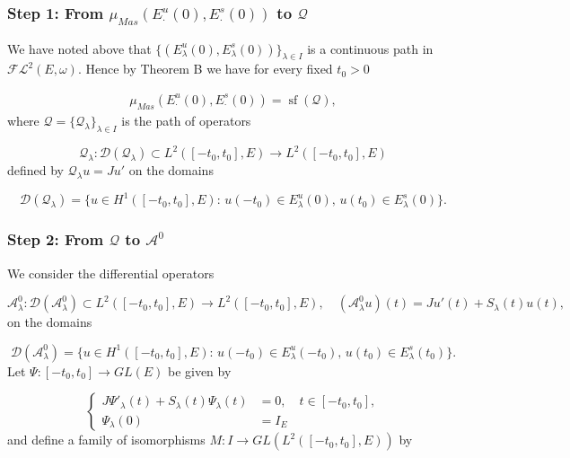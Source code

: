 \documentclass[a4paper,10pt]{article}
\DeclareMathOperator{\sfl}{sf}
\begin{document}
\subsubsection*{Step 1: From $\mu_{Mas}(E^u_\cdot(0),E^s_\cdot(0))$ to $\mathcal{Q}$}
We have noted above that $\{(E^u_\lambda(0),E^s_\lambda(0))\}_{\lambda\in I}$ is a continuous path in $\mathcal{FL}^2(E,\omega)$. Hence by Theorem B we have for every fixed $t_0>0$

\begin{align}\label{mas=sfl}
\mu_{Mas}(E^u_\cdot(0),E^s_\cdot(0))=\sfl(\mathcal{Q}),
\end{align}
where $\mathcal{Q}=\{\mathcal{Q}_\lambda\}_{\lambda\in I}$ is the path of operators 

\[\mathcal{Q}_\lambda:\mathcal{D}(\mathcal{Q}_\lambda)\subset L^2([-t_0,t_0],E)\rightarrow L^2([-t_0,t_0],E)\] defined by $\mathcal{Q}_\lambda u=Ju'$ on the domains

\[\mathcal{D}(\mathcal{Q}_\lambda)=\{u\in H^1([-t_0,t_0],E):\, u(-t_0)\in E^u_\lambda(0),\, u(t_0)\in E^s_\lambda(0)\}.\]







\subsubsection*{Step 2: From $\mathcal{Q}$ to $\mathcal{A}^0$}
We consider the differential operators

\[\mathcal{A}^0_\lambda:\mathcal{D}(\mathcal{A}^0_\lambda)\subset L^2([-t_0,t_0],E)\rightarrow L^2([-t_0,t_0],E),\quad (\mathcal{A}^0_\lambda u)(t)=Ju'(t)+S_\lambda(t)u(t),\]
on the domains

\[\mathcal{D}(\mathcal{A}^0_\lambda)=\{u\in H^1([-t_0,t_0],E):\, u(-t_0)\in E^u_\lambda(-t_0),\, u(t_0)\in E^s_\lambda(t_0)\}.\]
Let $\Psi:[-t_0,t_0]\rightarrow GL(E)$ be given by


\begin{equation}\label{Psi}
\left\{
\begin{aligned}
J\Psi'_\lambda(t)+S_\lambda(t)\Psi_\lambda(t)&=0,\quad t\in[-t_0,t_0],\\
\Psi_\lambda(0)&=I_{E}
\end{aligned}
\right.
\end{equation}
and define a family of isomorphisms $M:I\rightarrow GL(L^2([-t_0,t_0],E))$ by
\end{document}
